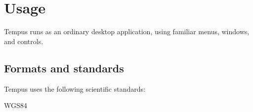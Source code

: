 \section{Usage}

Tempus runs as an ordinary desktop application, using familiar menus, windows, and controls.

\subsection{Formats and standards}

Tempus uses the following scientific standards:

WGS84
